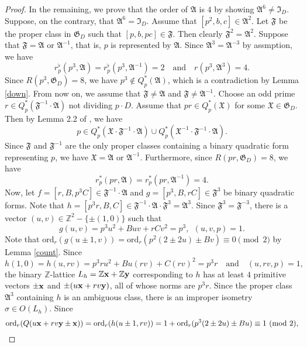 \documentclass{amsart}
\theoremstyle{definition}
\theoremstyle{remark}
\numberwithin{equation}{section}
\begin{document}
\begin{proof}
In the remaining, we prove that  the order of $\mathfrak A$ is $4$ by showing $\mathfrak A^6 \ne \mathfrak I_D$.  Suppose, on the contrary, that $\mathfrak A^6=\mathfrak I_D$. 
Assume that $[p^2,b,c] \in \mathfrak A^2$. Let $\mathfrak F$ be the proper class in $\mathfrak G_D$ such that  $[p,b,pc] \in \mathfrak F$. 
Then clearly $\mathfrak F^2=\mathfrak A^2$.  Suppose that $\mathfrak F=\mathfrak A$ or $\mathfrak A^{-1}$, that is, $p$ is represented by $\mathfrak A$. Since $\mathfrak A^3=\mathfrak A^{-3}$ by assmption, we have
$$
r_p^{\flat}(p^3,\mathfrak A)=r_p^{\flat}(p^3,\mathfrak A^{-1})=2 \quad\text{and} \quad r(p^3,\mathfrak A^3)=4.
$$
Since $R(p^3,\mathfrak G_D)=8$, we have  $p^3 \not \in Q_p^*(\mathfrak A)$, which is a contradiction by Lemma \ref{down}. From now on, we assume that $\mathfrak F \ne \mathfrak A$ and $\mathfrak F \ne \mathfrak A^{-1}$. Choose an odd prime $r \in Q_p^*(\mathfrak F^{-1}\cdot\mathfrak A)$ not dividing  $p\cdot D$. Assume that $pr \in Q_p^*(\mathfrak X)$ for some $\mathfrak X \in \mathfrak G_D$. Then by Lemma 2.2 of \cite{ef}, we have
$$
p \in Q_p^*(\mathfrak X\cdot\mathfrak F^{-1}\cdot\mathfrak A) \cup Q_p^*(\mathfrak X^{-1}\cdot\mathfrak F^{-1}\cdot\mathfrak A). 
$$ 
Since $\mathfrak F$ and $\mathfrak F^{-1}$ are the only proper classes containing  a binary quadratic form representing $p$, we have $\mathfrak X=\mathfrak A$ or $\mathfrak A^{-1}$. Furthermore, since $R(pr, \mathfrak G_D)=8$, we have 
$$
r_p^*(pr,\mathfrak A)=r_p^*(pr,\mathfrak A^{-1})=4.
$$ 
Now, let $f=[r,B,p^3C]\in \mathfrak F^{-1}\cdot\mathfrak A$ and $g=[p^3,B,rC] \in  \mathfrak F^3$ be binary quadratic forms. Note that 
$h=[p^3r,B,C] \in \mathfrak F^{-1}\cdot\mathfrak A\cdot \mathfrak F^3=\mathfrak A^3$. 
Since $\mathfrak F^3=\mathfrak F^{-3}$,  there is  a vector $(u,v) \in {{\mathbb Z}}^2-\{\pm(1,0)\}$ such that 
$$
g(u,v)=p^3u^2+Buv+rCv^2=p^3, \  \ (u,v,p)=1.
$$
Note that ${\text{ord}}_r(g(u\pm1,v))={\text{ord}}_r(p^2(2\pm2u)\pm Bv) \equiv 0 \pmod 2$ by Lemma \ref{count}. Since 
$$
h(1,0)=h(u,rv)=p^3ru^2+Bu(rv)+C(rv)^2=p^3r \quad \text{and} \quad (u,rv,p)=1,
$$
the binary ${{\mathbb Z}}$-lattice $L_h={{\mathbb Z}} \bold x+{{\mathbb Z}} \bold y$ corresponding to $h$ has at least $4$ primitive vectors $\pm \bold x$ and 
$\pm(u\bold x+rv\bold y)$,
all of whose norms are $p^3r$. Since the proper class $\mathfrak A^3$ containing $h$ is an ambiguous class, there is an improper isometry $\sigma \in O(L_h)$.  Since
$$
{\text{ord}}_r(Q(u\bold x+rv\bold y \pm \bold x))={\text{ord}}_r(h(u\pm1,rv))=1+{\text{ord}}_r(p^3(2\pm 2u)\pm Bu) \equiv 1 \ (\text{mod } 2),
$$
\end{proof}
\end{document}
